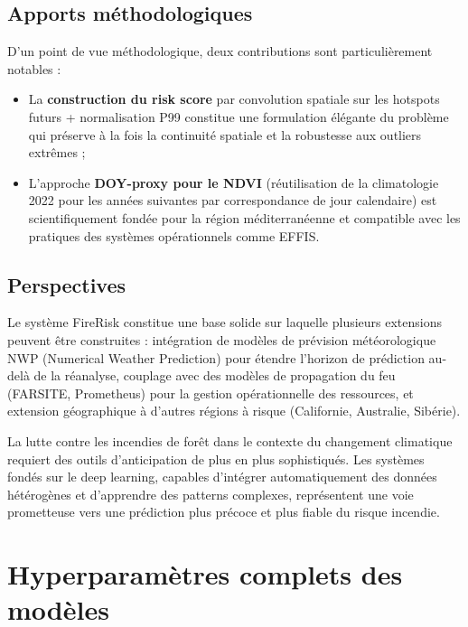 \documentclass[12pt,a4paper]{report}
\begin{document}
\section{Apports méthodologiques}

D'un point de vue méthodologique, deux contributions sont particulièrement notables :

\begin{itemize}[leftmargin=*,itemsep=4pt]
  \item La \textbf{construction du risk score} par convolution spatiale sur les
    hotspots futurs + normalisation P99 constitue une formulation élégante du
    problème qui préserve à la fois la continuité spatiale et la robustesse aux
    outliers extrêmes ;
  \item L'approche \textbf{DOY-proxy pour le NDVI} (réutilisation de la climatologie
    2022 pour les années suivantes par correspondance de jour calendaire) est
    scientifiquement fondée pour la région méditerranéenne et compatible avec les
    pratiques des systèmes opérationnels comme EFFIS.
\end{itemize}

\section{Perspectives}

Le système FireRisk constitue une base solide sur laquelle plusieurs extensions
peuvent être construites : intégration de modèles de prévision météorologique NWP
(Numerical Weather Prediction) pour étendre l'horizon de prédiction au-delà de la
réanalyse, couplage avec des modèles de propagation du feu (FARSITE, Prometheus) pour
la gestion opérationnelle des ressources, et extension géographique à d'autres
régions à risque (Californie, Australie, Sibérie).

La lutte contre les incendies de forêt dans le contexte du changement climatique
requiert des outils d'anticipation de plus en plus sophistiqués. Les systèmes fondés
sur le deep learning, capables d'intégrer automatiquement des données hétérogènes
et d'apprendre des patterns complexes, représentent une voie prometteuse vers une
prédiction plus précoce et plus fiable du risque incendie.

\clearpage

\appendix

\chapter{Hyperparamètres complets des modèles}
\end{document}
